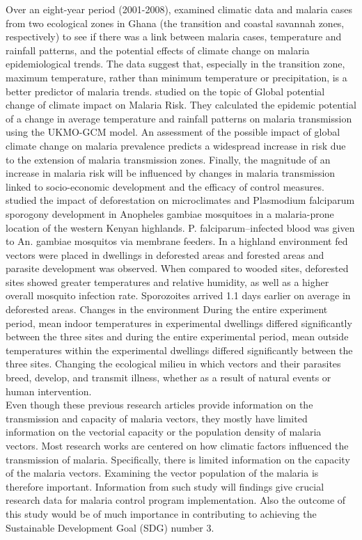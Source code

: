 \noindent Over an eight-year period (2001-2008), \cite{klutse2014assessment} examined climatic data and malaria cases from two ecological zones in Ghana (the transition and coastal savannah zones, respectively) to see if there was a link between malaria cases, temperature and rainfall patterns, and the potential effects of climate change on malaria epidemiological trends. The data suggest that, especially in the transition zone, maximum temperature, rather than minimum temperature or precipitation, is a better predictor of malaria trends.
 \cite{martens1995potential} studied on the topic of Global potential change of climate impact on Malaria Risk. They calculated the epidemic potential of a change in average temperature and rainfall patterns on malaria transmission using the UKMO-GCM model. An assessment of the possible impact of global climate change on malaria prevalence predicts a widespread increase in risk due to the extension of malaria transmission zones. Finally, the magnitude of an increase in malaria risk will be influenced by changes in malaria transmission linked to socio-economic development and the efficacy of control measures.
 \cite{afrane2008deforestation} studied the impact of deforestation on microclimates and Plasmodium falciparum sporogony development in Anopheles gambiae mosquitoes in a malaria-prone location of the western Kenyan highlands. P. falciparum–infected blood was given to An. gambiae mosquitos via membrane feeders. In a highland environment fed vectors were placed in dwellings in deforested areas and forested areas and parasite development was observed. When compared to wooded sites, deforested sites showed greater temperatures and relative humidity, as well as a higher overall mosquito infection rate. Sporozoites arrived 1.1 days earlier on average in deforested areas. Changes in the environment During the entire experiment period, mean indoor temperatures in experimental dwellings differed significantly between the three sites and during the entire experimental period, mean outside temperatures within the experimental dwellings differed significantly between the three sites. Changing the ecological milieu in which vectors and their parasites breed, develop, and transmit illness, whether as a result of natural events or human intervention.\\

\noindent Even though these previous research articles provide information on the transmission and capacity of malaria vectors, they mostly have limited information on the vectorial capacity or the population density of malaria vectors. Most research works are centered on how climatic factors influenced the transmission of malaria. Specifically, there is limited information on the capacity of the malaria vectors. Examining the vector population of the malaria is therefore important. Information from such study will findings give crucial research data for malaria control program implementation. Also the outcome of this study would be of much importance in contributing to achieving the Sustainable Development Goal (SDG) number 3.